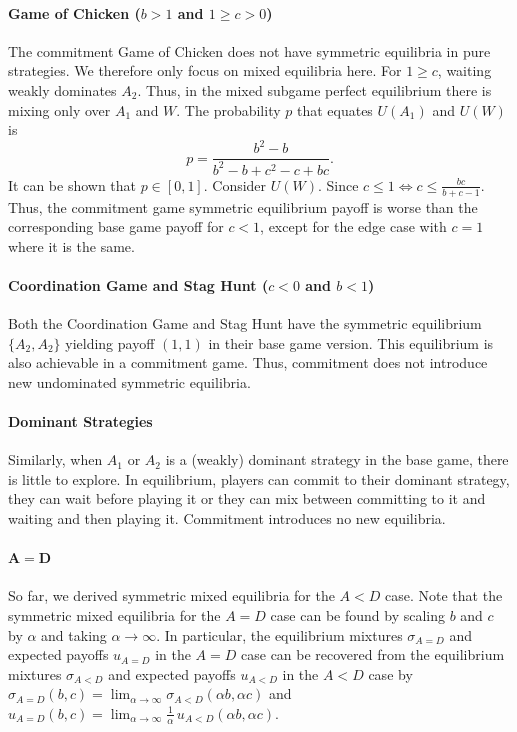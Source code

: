 \documentclass[letterpaper]{article}
\newcommand{\bparam}{b}
\newcommand{\cparam}{c}
\theoremstyle{definition}
\begin{document}
\paragraph{Game of Chicken ($\bparam>1$ and $1\geq \cparam>0$)}
The commitment Game of Chicken does not have symmetric equilibria in pure strategies. We therefore only focus on mixed equilibria here. %
For $1\geq\cparam$, waiting weakly dominates $A_2$. Thus, in the mixed subgame perfect equilibrium there is mixing only over $A_1$ and $W$. The probability $p$ that equates $U(A_1)$ and $U(W)$ is
\[
p=\frac{\bparam^2-\bparam}{\bparam^2-\bparam+\cparam^2-\cparam+\bparam\cparam}.
\]
It can be shown that $p\in[0,1]$. Consider $U(W)$. Since $\cparam\leq1\Leftrightarrow \cparam\leq\tfrac{\bparam\cparam}{\bparam+\cparam-1}$.
Thus, the commitment game symmetric equilibrium payoff is worse than the corresponding base game payoff for $\cparam<1$, except for the edge case with $\cparam=1$ where it is the same.

\paragraph{Coordination Game and Stag Hunt ($\cparam<0$ and $\bparam<1$)}
Both the Coordination Game and Stag Hunt have the symmetric equilibrium $\{A_2,A_2\}$ yielding payoff $(1,1)$ in their base game version.
This equilibrium is also achievable in a commitment game. Thus, commitment does not introduce new undominated symmetric equilibria.

\paragraph{Dominant Strategies}
Similarly, when $A_1$ or $A_2$ is a (weakly) dominant strategy in the base game, there is little to explore.
In equilibrium, players can commit to their dominant strategy, they can wait before playing it or they can mix between committing to it and waiting and then playing it.
Commitment introduces no new equilibria.

\paragraph{$\boldsymbol{A=D}$}
So far, we derived symmetric mixed equilibria for the $A<D$ case. Note that the symmetric mixed equilibria for the $A=D$ case can be found by scaling $\bparam$ and $\cparam$ by $\alpha$ and taking $\alpha \to \infty$. In particular, the equilibrium mixtures $\sigma_{A=D}$ and expected payoffs $u_{A=D}$ in the $A=D$ case can be recovered from the equilibrium mixtures $\sigma_{A<D}$ and expected payoffs $u_{A<D}$ in the $A<D$ case by $\sigma_{A=D}(\bparam,\cparam) = \lim_{\alpha \to \infty} \sigma_{A<D}(\alpha \bparam,\alpha \cparam)$ and $u_{A=D}(\bparam,\cparam) = \lim_{\alpha \to \infty} \frac{1}{\alpha}\,u_{A<D}(\alpha \bparam,\alpha \cparam)$.
\end{document}
